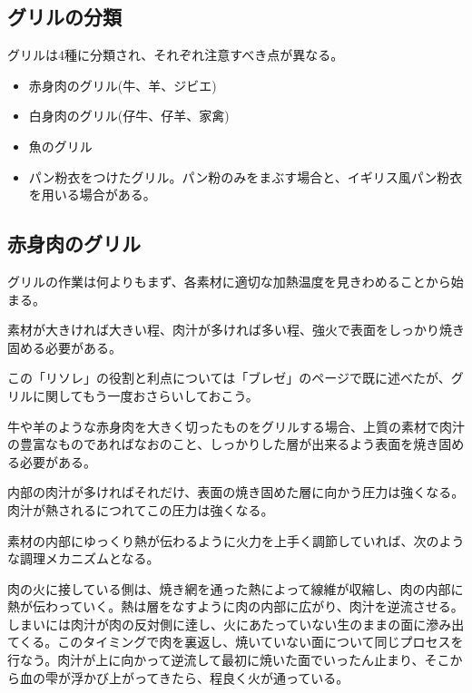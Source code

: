 \hypertarget{ux30b0ux30eaux30ebux306eux5206ux985e}{%
\subsection{グリルの分類}\label{ux30b0ux30eaux30ebux306eux5206ux985e}}

グリルは4種に分類され、それぞれ注意すべき点が異なる。

\begin{itemize}
\tightlist
\item
  赤身肉のグリル(牛、羊、ジビエ)
\item
  白身肉のグリル(仔牛、仔羊、家禽)
\item
  魚のグリル
\item
  パン粉衣をつけたグリル。パン粉のみをまぶす場合と、イギリス風パン粉衣を用いる場合がある。
\end{itemize}

\hypertarget{ux8d64ux8eabux8089ux306eux30b0ux30eaux30eb}{%
\subsection{赤身肉のグリル}\label{ux8d64ux8eabux8089ux306eux30b0ux30eaux30eb}}

グリルの作業は何よりもまず、各素材に適切な加熱温度を見きわめることから始まる。

素材が大きければ大きい程、肉汁が多ければ多い程、強火で表面をしっかり焼き固める必要がある。

この「リソレ」の役割と利点については「ブレゼ」のページで既に述べたが、グリルに関してもう一度おさらいしておこう。

牛や羊のような赤身肉を大きく切ったものをグリルする場合、上質の素材で肉汁の豊富なものであればなおのこと、しっかりした層が出来るよう表面を焼き固める必要がある。

内部の肉汁が多ければそれだけ、表面の焼き固めた層に向かう圧力は強くなる。肉汁が熱されるにつれてこの圧力は強くなる。

素材の内部にゆっくり熱が伝わるように火力を上手く調節していれば、次のような調理メカニズムとなる。

肉の火に接している側は、焼き網を通った熱によって線維が収縮し、肉の内部に熱が伝わっていく。熱は層をなすように肉の内部に広がり、肉汁を逆流させる。しまいには肉汁が肉の反対側に逹し、火にあたっていない生のままの面に滲み出てくる。このタイミングで肉を裏返し、焼いていない面について同じプロセスを行なう。肉汁が上に向かって逆流して最初に焼いた面でいったん止まり、そこから血の雫が浮かび上がってきたら、程良く火が通っている。

